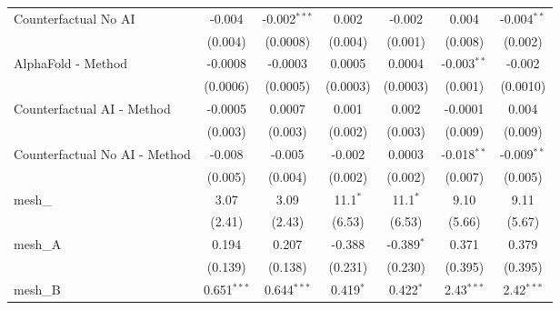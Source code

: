 \begin{tabular}{lcccccc}
   Counterfactual No AI                                        & -0.004         & -0.002$^{***}$ & 0.002          & -0.002         & 0.004          & -0.004$^{**}$\\   
                                                               & (0.004)        & (0.0008)       & (0.004)        & (0.001)        & (0.008)        & (0.002)\\   
   AlphaFold - Method                                          & -0.0008        & -0.0003        & 0.0005         & 0.0004         & -0.003$^{**}$  & -0.002\\   
                                                               & (0.0006)       & (0.0005)       & (0.0003)       & (0.0003)       & (0.001)        & (0.0010)\\   
   Counterfactual AI - Method                                  & -0.0005        & 0.0007         & 0.001          & 0.002          & -0.0001        & 0.004\\   
                                                               & (0.003)        & (0.003)        & (0.002)        & (0.003)        & (0.009)        & (0.009)\\   
   Counterfactual No AI - Method                               & -0.008         & -0.005         & -0.002         & 0.0003         & -0.018$^{**}$  & -0.009$^{**}$\\   
                                                               & (0.005)        & (0.004)        & (0.002)        & (0.002)        & (0.007)        & (0.005)\\   
   mesh\_                                                      & 3.07           & 3.09           & 11.1$^{*}$     & 11.1$^{*}$     & 9.10           & 9.11\\   
                                                               & (2.41)         & (2.43)         & (6.53)         & (6.53)         & (5.66)         & (5.67)\\   
   mesh\_A                                                     & 0.194          & 0.207          & -0.388         & -0.389$^{*}$   & 0.371          & 0.379\\   
                                                               & (0.139)        & (0.138)        & (0.231)        & (0.230)        & (0.395)        & (0.395)\\   
   mesh\_B                                                     & 0.651$^{***}$  & 0.644$^{***}$  & 0.419$^{*}$    & 0.422$^{*}$    & 2.43$^{***}$   & 2.42$^{***}$\\   

\end{tabular}
